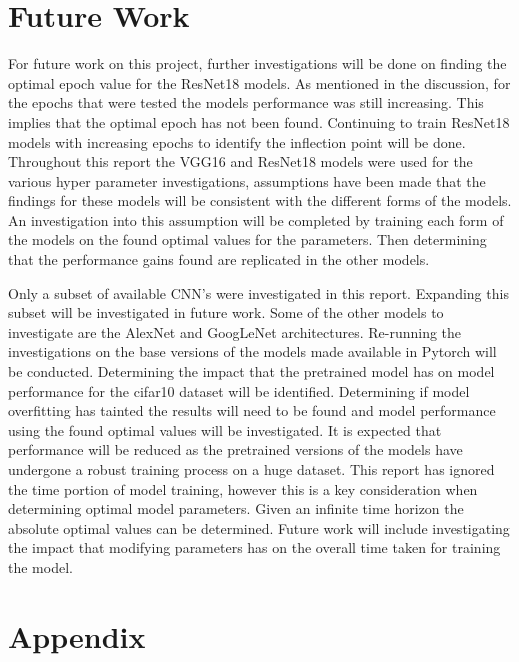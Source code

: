 \documentclass[10pt,twocolumn,letterpaper]{article}
\begin{document}
\section{Future Work}
For future work on this project, further investigations will be done on finding the optimal 
epoch value for the ResNet18 models. As mentioned in the discussion, for the epochs that were
tested the models performance was still increasing. This implies that the optimal epoch 
has not been found. Continuing to train ResNet18 models with increasing epochs to identify 
the inflection point will be done. Throughout this report the VGG16 and ResNet18 models 
were used for the various hyper parameter investigations, assumptions have been made 
that the findings for these models will be consistent with the different forms of the 
models. An investigation into this assumption will be completed by training each 
form of the models on the found optimal values for the parameters. Then determining 
that the performance gains found are replicated in the other models.

Only a subset of available CNN's were investigated in this report. Expanding this subset 
will be investigated in future work. Some of the other models to investigate are the 
AlexNet and GoogLeNet architectures. Re-running the investigations on the 
base versions of the models made available in Pytorch will be conducted. Determining 
the impact that the pretrained model has on model performance for the cifar10 dataset 
will be identified. Determining if model overfitting has tainted the results will need 
to be found and model performance using the found optimal values will be investigated.
It is expected that performance will be reduced as the pretrained versions of the models 
have undergone a robust training process on a huge dataset. This report has ignored 
the time portion of model training, however this is a key consideration when determining 
optimal model parameters. Given an infinite time horizon the absolute optimal values 
can be determined. Future work will include investigating the impact that modifying
parameters has on the overall time taken for training the model.
\small



\section{Appendix}
\end{document}
